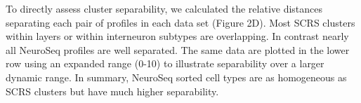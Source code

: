 To directly assess cluster separability, we calculated the relative distances separating each pair of profiles in each data set (Figure 2D). Most SCRS clusters within layers or within interneuron subtypes are overlapping. In contrast nearly all NeuroSeq profiles are well separated. The same data are plotted in the lower row using an expanded range (0-10) to illustrate separability over a larger dynamic range. In summary, NeuroSeq sorted cell types are as homogeneous as SCRS clusters but have much higher separability. 

